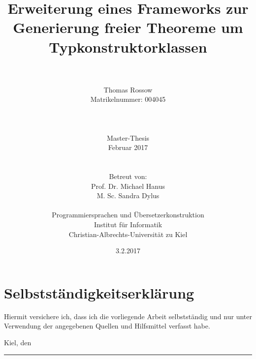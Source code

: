\documentclass[11pt]{article} %
\title{Erweiterung eines Frameworks zur Generierung freier Theoreme um Typkonstruktorklassen}
\author{
\\
\\
\large{Thomas Rossow} \\
\small{Matrikelnummer: 004045} \\ 
\\
\\
\\
Master-Thesis \\
\small{Februar 2017} \\
\\
\vspace{5cm} \\
\small{Betreut von:} \\ Prof. Dr. Michael Hanus \\ M. Sc. Sandra Dylus \\
\vspace{3cm} \\
\small{Programmiersprachen und Übersetzerkonstruktion} \\ \small{Institut für Informatik} \\ \small{Christian-Albrechts-Universität zu Kiel}
}
\date{} %
\begin{document}
\maketitle
\thispagestyle{empty}

\newpage
\thispagestyle{empty}
\section*{Selbstständigkeitserklärung}
\vspace{15mm}    %
 
Hiermit versichere ich, dass ich die vorliegende Arbeit selbstständig und nur unter
Verwendung der angegebenen Quellen und Hilfsmittel verfasst habe.

\vspace{30mm}
Kiel, den \date{3.2.2017}\hspace{45mm}
\rule{6cm}{0.1mm}
\vspace{5mm}

\newpage
\tableofcontents 



\clearpage


\clearpage

	
\clearpage


\clearpage


\clearpage


\clearpage


%

\clearpage



\clearpage
\appendix

\end{document}
